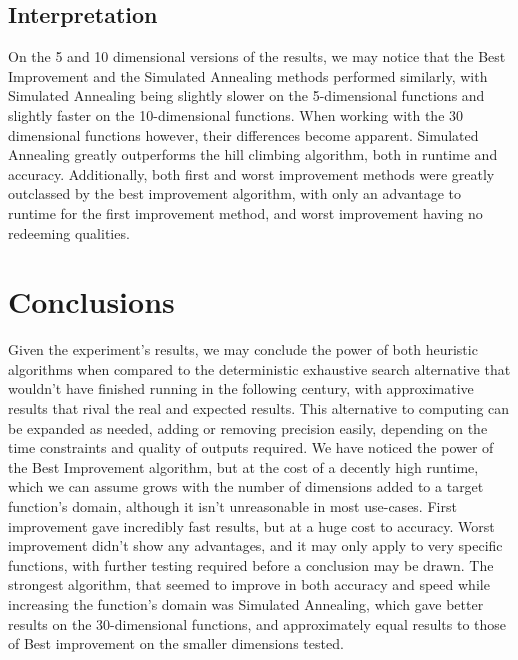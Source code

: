 \documentclass{article}
\begin{document}
\subsection{Interpretation}
On the 5 and 10 dimensional versions of the results, we may notice that the Best Improvement and the Simulated Annealing methods performed similarly, with Simulated Annealing being slightly slower on the 5-dimensional functions and slightly faster on the 10-dimensional functions. When working with the 30 dimensional functions however, their differences become apparent. Simulated Annealing greatly outperforms the hill climbing algorithm, both in runtime and accuracy. Additionally, both first and worst improvement methods were greatly outclassed by the best improvement algorithm, with only an advantage to runtime for the first improvement method, and worst improvement having no redeeming qualities.

\section{Conclusions}
Given the experiment's results, we may conclude the power of both heuristic algorithms when compared to the deterministic exhaustive search alternative that wouldn't have finished running in the following century, with approximative results that rival the real and expected results. This alternative to computing can be expanded as needed, adding or removing precision easily, depending on the time constraints and quality of outputs required. We have noticed the power of the Best Improvement algorithm, but at the cost of a decently high runtime, which we can assume grows with the number of dimensions added to a target function's domain, although it isn't unreasonable in most use-cases. First improvement gave incredibly fast results, but at a huge cost to accuracy. Worst improvement didn't show any advantages, and it may only apply to very specific functions, with further testing required before a conclusion may be drawn. The strongest algorithm, that seemed to improve in both accuracy and speed while increasing the function's domain was Simulated Annealing, which gave better results on the 30-dimensional functions, and approximately equal results to those of Best improvement on the smaller dimensions tested.
\end{document}
